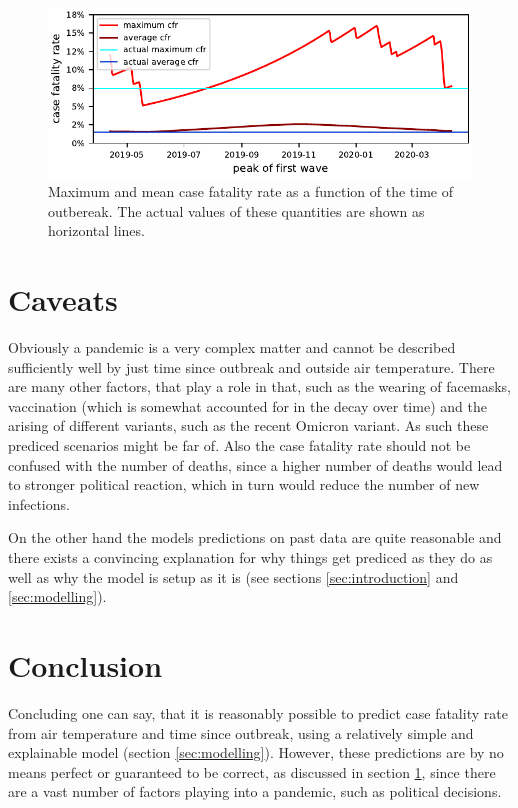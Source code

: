 \documentclass{article}
\begin{document}
\begin{figure}[hbt!]
  \begin{center}
    \includegraphics{../fig/MaxMeanCfr.pdf}
    \caption{Maximum and mean case fatality rate as a function of the time of outbereak. The actual values of these quantities are shown as horizontal lines.}
    \label{fig:max_mean_cfr}
  \end{center}
\end{figure}

\section{Caveats}
\label{sec:caveats}

Obviously a pandemic is a very complex matter and cannot be described sufficiently well by just time since outbreak and outside air temperature. There are many other factors, that play a role in that, such as the wearing of facemasks, vaccination (which is somewhat accounted for in the decay over time) and the arising of different variants, such as the recent Omicron variant. As such these prediced scenarios might be far of. Also the case fatality rate should not be confused with the number of deaths, since a higher number of deaths would lead to stronger political reaction, which in turn would reduce the number of new infections. 

On the other hand the models predictions on past data are quite reasonable and there exists a convincing explanation for why things get prediced as they do as well as why the model is setup as it is (see sections \ref{sec:introduction} and \ref{sec:modelling}).

\section{Conclusion}

Concluding one can say, that it is reasonably possible to predict case fatality rate from air temperature and time since outbreak, using a relatively simple and explainable model (section \ref{sec:modelling}). However, these predictions are by no means perfect or guaranteed to be correct, as discussed in section \ref{sec:caveats}, since there are a vast number of factors playing into a pandemic, such as political decisions. 
\end{document}
